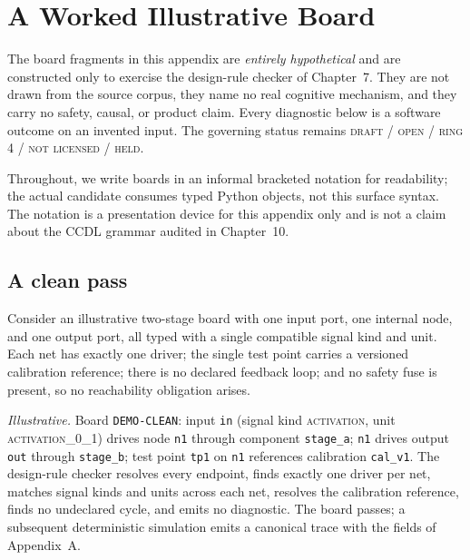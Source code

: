 \chapter{A Worked Illustrative Board}\label{appB:worked}

\begin{boundary}\label{appB:illustrative}
The board fragments in this appendix are \emph{entirely hypothetical} and are
constructed only to exercise the design-rule checker of Chapter~7. They are not
drawn from the source corpus, they name no real cognitive mechanism, and they
carry no safety, causal, or product claim. Every diagnostic below is a software
outcome on an invented input. The governing status remains \textsc{draft / open
/ ring 4 / not licensed / held}.
\end{boundary}

Throughout, we write boards in an informal bracketed notation for readability;
the actual candidate consumes typed Python objects, not this surface syntax. The
notation is a presentation device for this appendix only and is not a claim about
the CCDL grammar audited in Chapter~10.

\section{A clean pass}\label{appB:clean}

Consider an illustrative two-stage board with one input port, one internal node,
and one output port, all typed with a single compatible signal kind and unit.
Each net has exactly one driver; the single test point carries a versioned
calibration reference; there is no declared feedback loop; and no safety fuse is
present, so no reachability obligation arises.

\begin{example}\label{appB:cleanex}
\textit{Illustrative.} Board \texttt{DEMO-CLEAN}: input \texttt{in} (signal kind
\textsc{activation}, unit \textsc{activation\_0\_1}) drives node \texttt{n1} through
component \texttt{stage\_a}; \texttt{n1} drives output \texttt{out} through
\texttt{stage\_b}; test point \texttt{tp1} on \texttt{n1} references calibration
\texttt{cal\_v1}. The design-rule checker resolves every endpoint, finds exactly
one driver per net, matches signal kinds and units across each net, resolves the
calibration reference, finds no undeclared cycle, and emits no diagnostic. The
board passes; a subsequent deterministic simulation emits a canonical trace with
the fields of Appendix~A.
\end{example}

